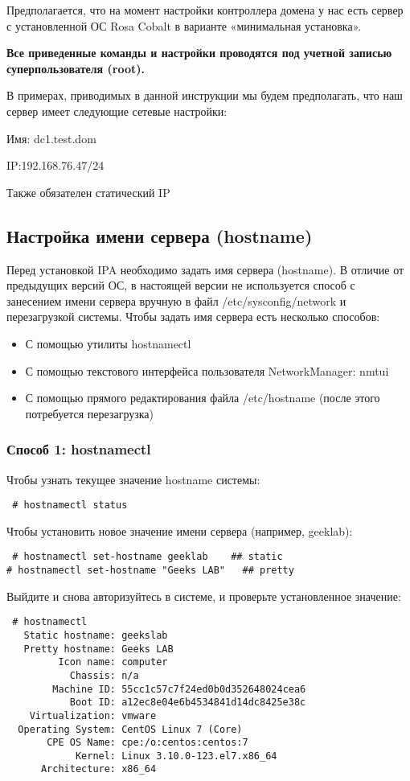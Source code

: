 \documentclass[a4paper,10pt,twoside]{article}
\begin{document}
Предполагается, что на момент настройки контроллера домена у нас есть сервер с установленной ОС Rosa Cobalt в варианте «минимальная установка».

\textbf{Все приведенные команды и настройки проводятся под учетной записью суперпользователя (root).}

В примерах, приводимых в данной инструкции мы будем предполагать, что наш сервер имеет следующие сетевые настройки:

 Имя: dc1.test.dom
 
 IP:192.168.76.47/24
 
Также обязателен статический IP

\subsection{Настройка имени сервера (hostname)}
Перед установкой IPA необходимо задать имя сервера (hostname). В отличие от предыдущих версий ОС, в настоящей версии не используется способ с занесением имени сервера вручную в файл /etc/sysconfig/network и перезагрузкой системы. Чтобы задать имя сервера есть несколько способов:

\begin{itemize}
 \item С помощью утилиты hostnamectl
\item С помощью текстового интерфейса пользователя NetworkManager: nmtui
\item С помощью прямого редактирования файла /etc/hostname (после этого потребуется перезагрузка)
\end{itemize}

\subsubsection{Способ 1: hostnamectl}
Чтобы узнать текущее значение hostname системы:
\begin{verbatim}
 # hostnamectl status
\end{verbatim}

Чтобы установить новое значение имени сервера (например,  geeklab):
\begin{verbatim}
 # hostnamectl set-hostname geeklab    ## static
# hostnamectl set-hostname "Geeks LAB"   ## pretty
\end{verbatim}

Выйдите и снова авторизуйтесь в системе, и проверьте установленное значение:
\begin{verbatim}
 # hostnamectl
   Static hostname: geekslab
   Pretty hostname: Geeks LAB
         Icon name: computer
           Chassis: n/a
        Machine ID: 55cc1c57c7f24ed0b0d352648024cea6
           Boot ID: a12ec8e04e6b4534841d14dc8425e38c
    Virtualization: vmware
  Operating System: CentOS Linux 7 (Core)
       CPE OS Name: cpe:/o:centos:centos:7
            Kernel: Linux 3.10.0-123.el7.x86_64
      Architecture: x86_64
\end{verbatim}
\end{document}

